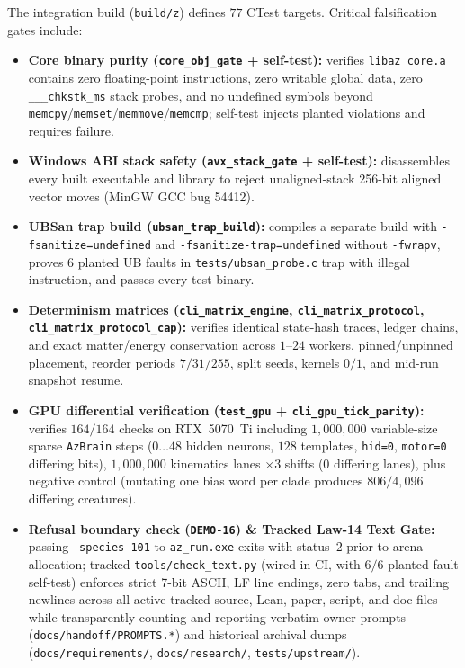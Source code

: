 \documentclass[11pt,reqno]{amsart}
\newcommand{\code}[1]{\texttt{\footnotesize #1}}
\newcommand{\us}{\_\allowbreak}
\newcommand{\slsh}{/\allowbreak}
\begin{document}
The integration build (\code{build/z}) defines $77$ CTest targets. Critical falsification gates include:
\begin{itemize}[leftmargin=1.8em,itemsep=2pt]
  \item \textbf{Core binary purity (\code{core\us obj\us gate} + self-test):} verifies \code{libaz\us core.a} contains zero floating-point instructions, zero writable global data, zero \code{\us\us\us chkstk\us ms} stack probes, and no undefined symbols beyond \code{memcpy}/\code{memset}/\code{memmove}/\code{memcmp}; self-test injects planted violations and requires failure.
  \item \textbf{Windows ABI stack safety (\code{avx\us stack\us gate} + self-test):} disassembles every built executable and library to reject unaligned-stack 256-bit aligned vector moves (MinGW GCC bug 54412).
  \item \textbf{UBSan trap build (\code{ubsan\us trap\us build}):} compiles a separate build with \code{-fsanitize=undefined} and \code{-fsanitize-trap=undefined} without \code{-fwrapv}, proves $6$ planted UB faults in \code{tests\slsh ubsan\us probe.c} trap with illegal instruction, and passes every test binary.
  \item \textbf{Determinism matrices (\code{cli\us matrix\us engine}, \code{cli\us matrix\us protocol}, \code{cli\us matrix\us protocol\us cap}):} verifies identical state-hash traces, ledger chains, and exact matter/energy conservation across $1$--$24$ workers, pinned/unpinned placement, reorder periods $7/31/255$, split seeds, kernels $0/1$, and mid-run snapshot resume.
  \item \textbf{GPU differential verification (\code{test\us gpu} + \code{cli\us gpu\us tick\us parity}):} verifies $164/164$ checks on RTX~5070~Ti including $1{,}000{,}000$ variable-size sparse \code{AzBrain} steps ($0\dots 48$ hidden neurons, $128$ templates, \code{hid=0}, \code{motor=0} differing bits), $1{,}000{,}000$ kinematics lanes $\times 3$ shifts ($0$ differing lanes), plus negative control (mutating one bias word per clade produces $806/4{,}096$ differing creatures).
  \item \textbf{Refusal boundary check (\code{DEMO-16}) \& Tracked Law-14 Text Gate:} passing \code{--species 101} to \code{az\us run.exe} exits with status~$2$ prior to arena allocation; tracked \code{tools\slsh check\us text.py} (wired in CI, with $6/6$ planted-fault self-test) enforces strict 7-bit ASCII, LF line endings, zero tabs, and trailing newlines across all active tracked source, Lean, paper, script, and doc files while transparently counting and reporting verbatim owner prompts (\code{docs\slsh handoff\slsh PROMPTS.*}) and historical archival dumps (\code{docs\slsh requirements/}, \code{docs\slsh research/}, \code{tests\slsh upstream/}).
\end{itemize}
\end{document}
